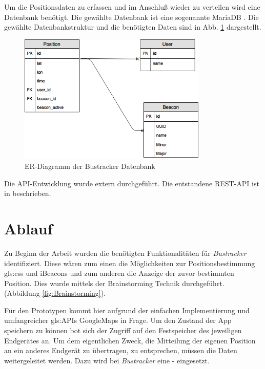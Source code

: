 Um die Positionsdaten zu erfassen und im Anschluß wieder zu verteilen wird eine Datenbank benötigt. Die gewählte Datenbank ist eine sogenannte MariaDB \cite{MariaDBDoku}.
Die gewählte Datenbankstruktur und die benötigten Daten sind in Abb. \ref{fig:ERD} dargestellt.

\begin{figure}[htbp] 
	\centering
	\includegraphics[width=0.8\textwidth]{images/ERDiagramm_bustracker.png} 
	\caption{ER-Diagramm der Bustracker Datenbank}
	\label{fig:ERD}
\end{figure}

 Die API-Entwicklung wurde extern durchgeführt. Die entstandene REST-API ist in \cite{btapidoku} beschrieben. 
\section{Ablauf}

Zu Beginn der Arbeit wurden die benötigten Funktionalitäten für \emph{Bustracker} identifiziert. Diese wären zum einen die Möglichkeiten zur Positionsbestimmung \gls{gls:css} und iBeacons und zum anderen die Anzeige der zuvor bestimmten Position. Dies wurde mittels der Brainstorming Technik durchgeführt. (Abbildung \ref{fig:Brainstorming}).

Für den Prototypen kommt hier aufgrund der einfachen Implementierung und umfangreicher \glspl{gls:API}  GoogleMaps in Frage. Um den Zustand der App speichern zu können bot sich der Zugriff auf den Festspeicher des jeweiligen Endgerätes an.  Um dem eigentlichen Zweck, die Mitteilung der eigenen Position an ein anderes Endgerät zu übertragen, zu entsprechen, müssen die Daten weitergeleitet werden.  Dazu wird bei \emph{Bustracker} eine  -  eingesetzt.  

